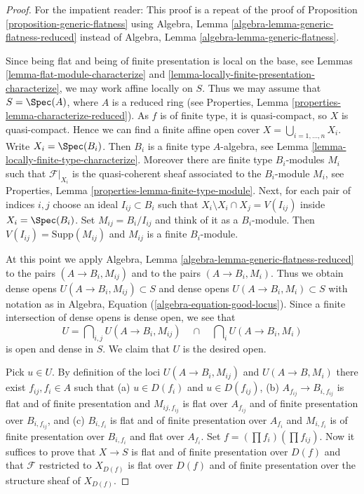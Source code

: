 \begin{proof}
For the impatient reader: This proof is a repeat of the proof of
Proposition \ref{proposition-generic-flatness}
using
Algebra, Lemma \ref{algebra-lemma-generic-flatness-reduced}
instead of
Algebra, Lemma \ref{algebra-lemma-generic-flatness}.

\medskip\noindent
Since being flat and being of finite presentation is local on the
base, see
Lemmas \ref{lemma-flat-module-characterize} and
\ref{lemma-locally-finite-presentation-characterize},
we may work affine locally on $S$. Thus we may assume that
$S = \Spec(A)$, where $A$ is a reduced ring (see
Properties, Lemma \ref{properties-lemma-characterize-reduced}).
As $f$ is of finite type, it is quasi-compact, so $X$ is quasi-compact.
Hence we can find a finite affine open cover
$X = \bigcup_{i = 1, \ldots, n} X_i$. Write $X_i = \Spec(B_i)$.
Then $B_i$ is a finite type $A$-algebra, see
Lemma \ref{lemma-locally-finite-type-characterize}.
Moreover there are finite type
$B_i$-modules $M_i$ such that $\mathcal{F}|_{X_i}$ is the
quasi-coherent sheaf associated to the $B_i$-module $M_i$, see
Properties, Lemma \ref{properties-lemma-finite-type-module}.
Next, for each pair of indices $i, j$ choose an ideal $I_{ij} \subset B_i$
such that $X_i \setminus X_i \cap X_j = V(I_{ij})$ inside
$X_i = \Spec(B_i)$. Set $M_{ij} = B_i/I_{ij}$ and think
of it as a $B_i$-module. Then $V(I_{ij}) = \text{Supp}(M_{ij})$
and $M_{ij}$ is a finite $B_i$-module.

\medskip\noindent
At this point we apply
Algebra, Lemma \ref{algebra-lemma-generic-flatness-reduced} to
the pairs $(A \to B_i, M_{ij})$ and to the pairs $(A \to B_i, M_i)$.
Thus we obtain dense opens
$U(A \to B_i, M_{ij}) \subset S$ and dense opens
$U(A \to B_i, M_i) \subset S$ with notation as in
Algebra, Equation (\ref{algebra-equation-good-locus}).
Since a finite intersection of dense opens is dense open, we see that
$$
U =
\bigcap\nolimits_{i, j} U(A \to B_i, M_{ij})
\quad\cap\quad
\bigcap\nolimits_i U(A \to B_i, M_i)
$$
is open and dense in $S$. We claim that $U$ is the desired open.

\medskip\noindent
Pick $u \in U$. By definition of the loci $U(A \to B_i, M_{ij})$
and $U(A \to B, M_i)$ there exist $f_{ij}, f_i \in A$ such that
(a) $u \in D(f_i)$ and $u \in D(f_{ij})$,
(b) $A_{f_{ij}} \to B_{i, f_{ij}}$ is flat and of finite presentation
and $M_{ij, f_{ij}}$ is flat over $A_{f_{ij}}$ and of finite presentation
over $B_{i, f_{ij}}$, and
(c) $B_{i, f_i}$ is flat and of finite presentation over $A_{f_i}$ and
$M_{i, f_i}$ is of finite presentation over $B_{i, f_i}$ and flat over
$A_{f_i}$. Set
$f = (\prod f_i) (\prod f_{ij})$.
Now it suffices to prove that $X \to S$ is flat and of finite presentation
over $D(f)$ and that $\mathcal{F}$ restricted to $X_{D(f)}$ is
flat over $D(f)$ and of finite presentation over the structure sheaf
of $X_{D(f)}$.


\end{proof}
